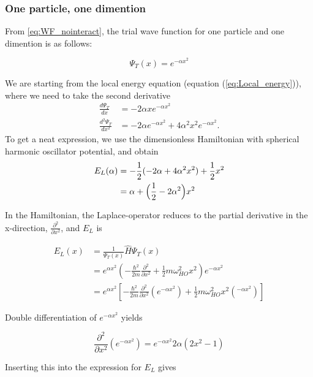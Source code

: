 \documentclass[norsk,a4paper,12pt]{article}
\begin{document}
\subsubsection{One particle, one dimention}

From \ref{eq:WF_nointeract}, the trial wave function for one particle and one dimention is as follows:

\begin{equation}
	\Psi_T(x) = e^{-\alpha x^2} 
\end{equation}

We are starting from the local energy equation (equation (\ref{eq:Local_energy})), where we need to take the second derivative
\begin{align}
\frac{d\Psi_T}{dx}&=-2\alpha xe^{-\alpha x^2}\\
\frac{d^2\Psi_T}{dx^2}&=-2\alpha e^{-\alpha x^2}+4\alpha^2x^2e^{-\alpha x^2}.
\end{align}
To get a neat expression, we use the dimensionless Hamiltonian with spherical harmonic oscillator potential, and obtain
\begin{align}
E_L(\alpha)&=-\frac{1}{2}(-2\alpha + 4\alpha^2x^2)+\frac{1}{2}x^2\notag\\
&=\alpha+\Big(\frac{1}{2}-2\alpha^2\Big)x^2
\end{align}

\iffalse
In the Hamiltonian, the Laplace-operator reduces to the partial derivative in the x-direction, $\frac{\partial^2 }{\partial x^2}$, and $E_L$ is 

\begin{equation}
\begin{aligned}
E_L(x) &=  \frac{1}{\Psi_T(x)}\hat{H}\Psi_T(x) \\ 
			 & =  e^{\alpha x^2} (-\frac{\hbar^2}{2m}\frac{\partial^2 }{\partial x^2} + \frac{1}{2} m \omega_{HO}^2 x^2) e^{-\alpha x^2}  \\
			 & = e^{\alpha x^2} [-\frac{\hbar^2}{2m}\frac{\partial^2 }{\partial x^2} (e^{-\alpha x^2}) + \frac{1}{2} m \omega_{HO}^2 x^2 (^{-\alpha x^2})]
\end{aligned}
\end{equation}

Double differentiation of $ e^{-\alpha x^2}$ yields

\begin{equation}
\frac{\partial^2}{\partial x^2} (e^{-\alpha x^2}) = e^{-\alpha x^2} 2 \alpha (2x^2 -1)
\end{equation}

Inserting this into the expression for $E_L$ gives
\end{document}
